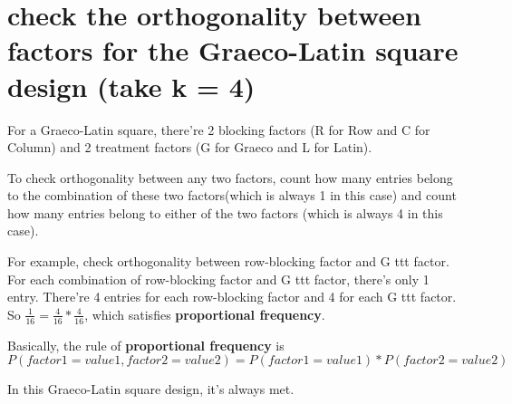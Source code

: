 \documentclass[a4paper,10pt]{article}
\begin{document}
\section{check the orthogonality between factors for the Graeco-Latin square
design (take k = 4)}
For a Graeco-Latin square, there're 2 blocking factors (R for Row and C for Column) and 2 treatment factors (G for Graeco and L for Latin).

To check orthogonality between any two factors, count how many entries belong to the combination of these two factors(which is always 1 in this case) and count how many entries belong to either of the two factors (which is always 4 in this case).

For example, check orthogonality between row-blocking factor and G ttt factor. For each combination of row-blocking factor and G ttt factor, there's only 1 entry. There're 4 entries  for each row-blocking factor and 4 for each G ttt factor. So $\frac{1}{16} = \frac{4}{16}*\frac{4}{16}$, which satisfies \textbf{proportional frequency}.

Basically, the rule of \textbf{proportional frequency} is
\begin{displaymath}
P(factor1=value1, factor2=value2) = P(factor1=value1)*P(factor2=value2)
\end{displaymath}

In this Graeco-Latin square design, it's always met.
\end{document}
